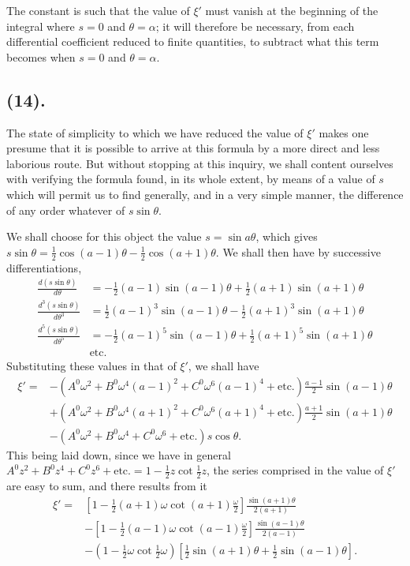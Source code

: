 \documentclass{article}
\begin{document}
The constant is such that the value of $\xi'$ must vanish at the beginning of the integral where $s=0$ and $\theta=\alpha$; it will therefore be necessary, from each differential coefficient reduced to finite quantities, to subtract what this term becomes when $s=0$ and $\theta=\alpha$.

\subsection*{(14).}

The state of simplicity to which we have reduced the value of $\xi'$ makes one presume that it is possible to arrive at this formula by a more direct and less laborious route. But without stopping at this inquiry, we shall content ourselves with verifying the formula found, in its whole extent, by means of a value of $s$ which will permit us to find generally, and in a very simple manner, the difference of any order whatever of $s\sin\theta$.

We shall choose for this object the value $s=\sin a\theta$, which gives $s\sin\theta=\frac{1}{2}\cos(a-1)\theta-\frac{1}{2}\cos(a+1)\theta$. We shall then have by successive differentiations,
\[ \begin{aligned} \frac{d(s\sin\theta)}{d\theta}&=-\tfrac{1}{2}(a-1)\sin(a-1)\theta+\tfrac{1}{2}(a+1)\sin(a+1)\theta\\ \frac{d^{3}(s\sin\theta)}{d\theta^{3}}&=\tfrac{1}{2}(a-1)^{3}\sin(a-1)\theta-\tfrac{1}{2}(a+1)^{3}\sin(a+1)\theta\\ \frac{d^{5}(s\sin\theta)}{d\theta^{5}}&=-\tfrac{1}{2}(a-1)^{5}\sin(a-1)\theta+\tfrac{1}{2}(a+1)^{5}\sin(a+1)\theta\\ &\text{etc.} \end{aligned} \]
Substituting these values in that of $\xi'$, we shall have
\[ \begin{aligned} \xi'={}&-(A^{0}\omega^{2}+B^{0}\omega^{4}(a-1)^{2}+C^{0}\omega^{6}(a-1)^{4}+\text{etc.})\frac{a-1}{2}\sin(a-1)\theta\\ &+(A^{0}\omega^{2}+B^{0}\omega^{4}(a+1)^{2}+C^{0}\omega^{6}(a+1)^{4}+\text{etc.})\frac{a+1}{2}\sin(a+1)\theta\\ &-(A^{0}\omega^{2}+B^{0}\omega^{4}+C^{0}\omega^{6}+\text{etc.})s\cos\theta. \end{aligned} \]
This being laid down, since we have in general $A^{0}z^{2}+B^{0}z^{4}+C^{0}z^{6}+\text{etc.}=1-\frac{1}{2}z\cot\frac{1}{2}z$, the series comprised in the value of $\xi'$ are easy to sum, and there results from it
\[ \begin{aligned} \xi'={}&\left[1-\tfrac{1}{2}(a+1)\omega\cot(a+1)\frac{\omega}{2}\right]\frac{\sin(a+1)\theta}{2(a+1)}\\ &-\left[1-\tfrac{1}{2}(a-1)\omega\cot(a-1)\frac{\omega}{2}\right]\frac{\sin(a-1)\theta}{2(a-1)}\\ &-(1-\tfrac{1}{2}\omega\cot\tfrac{1}{2}\omega)[\tfrac{1}{2}\sin(a+1)\theta+\tfrac{1}{2}\sin(a-1)\theta]. \end{aligned} \]
\end{document}
